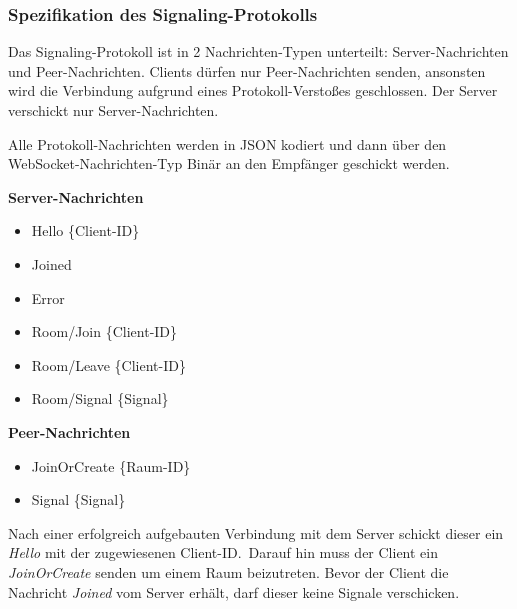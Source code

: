 \documentclass{article}
\begin{document}
\begin{onecolumn}
\subsubsection{Spezifikation des Signaling-Protokolls}\label{sec:signaling-spec}

Das Signaling-Protokoll ist in 2 Nachrichten-Typen unterteilt:
Server-Nachrichten und Peer-Nachrichten. Clients dürfen nur Peer-Nachrichten
senden, ansonsten wird die Verbindung aufgrund eines Protokoll-Verstoßes
geschlossen. Der Server verschickt nur Server-Nachrichten.

Alle Protokoll-Nachrichten werden in JSON kodiert und dann über den
WebSocket-Nachrichten-Typ Binär an den Empfänger geschickt werden.

\vspace{0.5em}

\textbf{Server-Nachrichten}

\begin{itemize}
	\item Hello \{Client-ID\}
	\item Joined
	\item Error
	\item Room/Join \{Client-ID\}
	\item Room/Leave \{Client-ID\}
	\item Room/Signal \{Signal\}
\end{itemize}

\vspace{0.5em}

\textbf{Peer-Nachrichten}

\begin{itemize}
	\item JoinOrCreate \{Raum-ID\}
	\item Signal \{Signal\}
\end{itemize}

\vspace{0.5em}

Nach einer erfolgreich aufgebauten Verbindung mit dem Server schickt dieser ein
\textit{Hello} mit der zugewiesenen Client-ID.\ Darauf hin muss der Client ein
\textit{JoinOrCreate} senden um einem Raum beizutreten. Bevor der Client die
Nachricht \textit{Joined} vom Server erhält, darf dieser keine Signale
verschicken.


\end{onecolumn}
\end{document}
